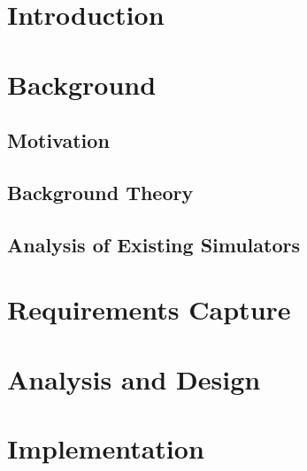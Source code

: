 \documentclass[11pt,a4paper,twoside,openright]{report}
\begin{document}

\pagebreak

\pagebreak

\cleardoublepage

\cleardoublepage


\tableofcontents
\cleardoublepage
\listoffigures
\cleardoublepage
\listoftables


\newpage

\chapter{Introduction}



\chapter{Background}

\section{Motivation}


\section{Background Theory}


\section{Analysis of Existing Simulators} \label{analysisOfSimulators} %


\chapter{Requirements Capture}



\chapter{Analysis and Design} \label{design}



\chapter{Implementation}

\end{document}
